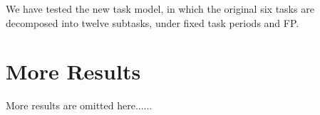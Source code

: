 We have tested the new task model, in which the original six tasks are decomposed into twelve subtasks, under fixed task periods and FP.

\section{More Results}

More results are omitted here......
